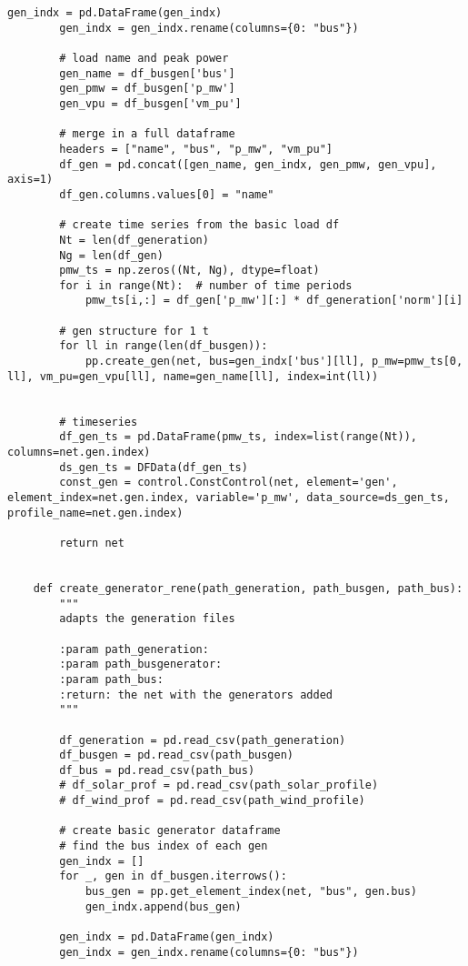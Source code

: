 \begin{lstlisting}[caption={Main code in Python with the Pandapower library}]
        gen_indx = pd.DataFrame(gen_indx)
        gen_indx = gen_indx.rename(columns={0: "bus"})

        # load name and peak power
        gen_name = df_busgen['bus']
        gen_pmw = df_busgen['p_mw']
        gen_vpu = df_busgen['vm_pu']

        # merge in a full dataframe
        headers = ["name", "bus", "p_mw", "vm_pu"]
        df_gen = pd.concat([gen_name, gen_indx, gen_pmw, gen_vpu], axis=1)
        df_gen.columns.values[0] = "name"

        # create time series from the basic load df
        Nt = len(df_generation)
        Ng = len(df_gen)
        pmw_ts = np.zeros((Nt, Ng), dtype=float)
        for i in range(Nt):  # number of time periods
            pmw_ts[i,:] = df_gen['p_mw'][:] * df_generation['norm'][i]

        # gen structure for 1 t
        for ll in range(len(df_busgen)):
            pp.create_gen(net, bus=gen_indx['bus'][ll], p_mw=pmw_ts[0, ll], vm_pu=gen_vpu[ll], name=gen_name[ll], index=int(ll))


        # timeseries
        df_gen_ts = pd.DataFrame(pmw_ts, index=list(range(Nt)), columns=net.gen.index)
        ds_gen_ts = DFData(df_gen_ts)
        const_gen = control.ConstControl(net, element='gen', element_index=net.gen.index, variable='p_mw', data_source=ds_gen_ts, profile_name=net.gen.index)

        return net


    def create_generator_rene(path_generation, path_busgen, path_bus):
        """
        adapts the generation files

        :param path_generation:
        :param path_busgenerator:
        :param path_bus:
        :return: the net with the generators added
        """

        df_generation = pd.read_csv(path_generation)
        df_busgen = pd.read_csv(path_busgen)
        df_bus = pd.read_csv(path_bus)
        # df_solar_prof = pd.read_csv(path_solar_profile)
        # df_wind_prof = pd.read_csv(path_wind_profile)

        # create basic generator dataframe
        # find the bus index of each gen
        gen_indx = []
        for _, gen in df_busgen.iterrows():
            bus_gen = pp.get_element_index(net, "bus", gen.bus)
            gen_indx.append(bus_gen)

        gen_indx = pd.DataFrame(gen_indx)
        gen_indx = gen_indx.rename(columns={0: "bus"})


\end{lstlisting}
